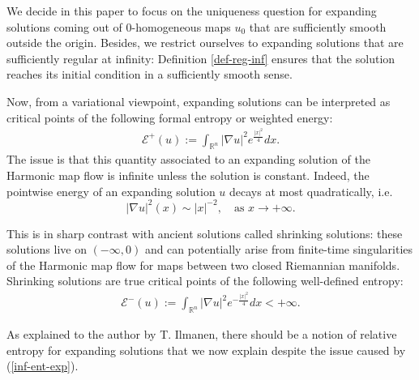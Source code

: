 \documentclass[a4paper,11pt,reqno]{amsart}
\begin{document}
We decide in this paper to focus on the uniqueness question for expanding solutions coming out of $0$-homogeneous maps $u_0$ that are sufficiently smooth outside the origin. Besides, we restrict ourselves to expanding solutions that are sufficiently regular at infinity: Definition \ref{def-reg-inf} ensures that the solution reaches its initial condition in a sufficiently smooth sense.

Now, from a variational viewpoint, expanding solutions can be interpreted as critical points of the following formal entropy or weighted energy:
\begin{eqnarray}
\mathcal{E}^+(u):=\int_{\mathbb{R}^n}|\nabla u|^2e^{\frac{|x|^2}{4}}dx.\label{inf-ent-exp}
\end{eqnarray}
 The issue is that this quantity associated to an expanding solution of the Harmonic map flow is infinite unless the solution is constant. Indeed, the pointwise energy of an expanding solution $u$ decays at most quadratically, i.e. $$|\nabla u|^2(x)\sim|x|^{-2},\quad\text{as $x\rightarrow+\infty$}.$$

This is in sharp contrast with ancient solutions called shrinking solutions: these solutions live on $(-\infty,0)$ and can potentially arise from finite-time singularities of the Harmonic map flow for maps between two closed Riemannian manifolds. Shrinking solutions are true critical points of the following well-defined entropy: 
\begin{eqnarray*}
\mathcal{E}^-(u):=\int_{\mathbb{R}^n}|\nabla u|^2e^{-\frac{|x|^2}{4}}dx<+\infty.
\end{eqnarray*}

As explained to the author by T. Ilmanen, there should be a notion of relative entropy for expanding solutions that we now explain despite the issue caused by (\ref{inf-ent-exp}).
\end{document}
